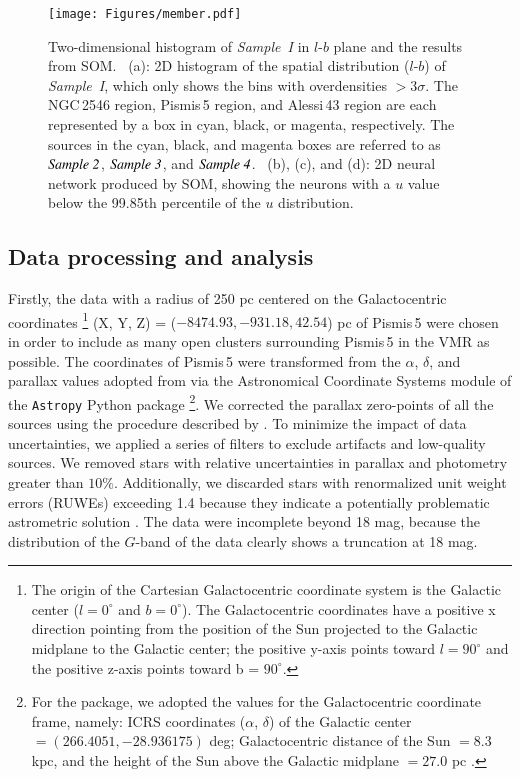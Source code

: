 \documentclass{aa} %
\begin{document}
\begin{figure*}%
    \centering
    \texttt{[image: Figures/member.pdf]}
    \caption{ Two-dimensional histogram of {\it Sample~I} in $l$-$b$ plane and the results from SOM. ~(a): 2D histogram of the spatial distribution ($l$-$b$) of     {\it Sample~I}, which only shows the bins with overdensities $> 3\sigma $. The NGC\,2546 region, 
    Pismis\,5 region, and Alessi\,43 region are each represented by a box in cyan, black, or magenta, 
    respectively. The sources in the cyan, black, and magenta boxes are referred to as
    {$\it Sample~2 $}, {$\it Sample~3 $}, and {$\it Sample~4 $}.
    ~(b), (c), and (d):  2D neural network produced by SOM, showing the neurons with a $u$ value below the 99.85th percentile of the $u$ distribution.} \label{fig:member}
    \end{figure*} 
    
\subsection{Data processing and analysis}
\label{subsec:Gaia DR3}

Firstly, the data with a radius of 250 pc centered on the Galactocentric coordinates
\footnote{The origin of the Cartesian Galactocentric coordinate system is the Galactic 
center ($l = 0^{\circ}$ and $b = 0^{\circ}$). The Galactocentric coordinates have a positive x 
direction pointing from the position of the Sun projected to the Galactic midplane to the Galactic center; the 
positive y-axis points toward $l = 90^{\circ}$ and the positive z-axis points toward b = $90^{\circ}$.}
(X, Y, Z) = ($-8474.93, -931.18, 42.54$) pc 
of Pismis\,5 were chosen in order to include as many open clusters surrounding Pismis\,5 in the 
VMR as possible. The coordinates of Pismis\,5 were 
transformed from the $\alpha$, $\delta$, and parallax values adopted from \citet{2020A&A...633A..99C} via the
Astronomical Coordinate Systems module of the \texttt{Astropy} Python 
package \citep{2013A&A...558A..33A,2018AJ....156..123A}\footnote{For the package, we adopted the values for the Galactocentric coordinate frame, namely: ICRS coordinates
($\alpha$, $\delta$) of the Galactic center $=(266.4051, -28.936175)$ deg; Galactocentric distance
of the Sun $=8.3$ kpc, and the height of the Sun above the Galactic midplane $=27.0$ pc \citep{2019ApJ...877...12T}.}.
We corrected the parallax zero-points of all the sources using the procedure described by 
\citet{2021A&A...649A...2L}. To minimize the impact of data uncertainties, we applied a series of filters to exclude artifacts and low-quality sources. We removed stars with relative uncertainties in parallax and photometry greater than $10\%$. Additionally, we discarded stars with renormalized unit weight errors (RUWEs) exceeding 1.4 because they indicate a potentially problematic astrometric solution \citep{2021A&A...649A...5F}.
The data were incomplete beyond 18 mag, because the distribution of the $G$-band of the data clearly shows a truncation at 18 mag. 
\end{document}

